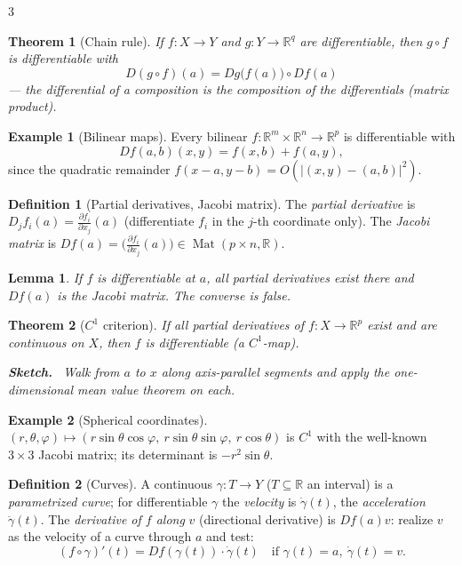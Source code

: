 \documentclass[10pt,a4paper,landscape]{article}
\theoremstyle{definition}
\newtheorem{defn}{Definition}[section]
\newtheorem{exm}{Example}[section]
\theoremstyle{plain}
\newtheorem{thm}{Theorem}[section]
\newtheorem{lem}{Lemma}[section]
\theoremstyle{remark}
\newcommand{\R}{\mathbb{R}}
\newcommand{\abs}[1]{\lvert #1 \rvert}
\newcommand{\comp}{\circ}
\DeclareMathOperator{\Mat}{Mat}
\newenvironment{proofsketch}{%
  \par\small\color{exgray}\textbf{Sketch.}\ }%
  {\par}
\begin{document}
\begin{multicols*}{3}
\begin{thm}[Chain rule]
If $f: X \to Y$ and $g: Y \to \R^q$ are differentiable, then $g \comp f$ is differentiable with
\[
D(g \comp f)(a) = Dg\bigl(f(a)\bigr) \comp Df(a)
\]
--- the differential of a composition is the composition of the differentials (matrix product).
\end{thm}

\begin{exm}[Bilinear maps]
Every bilinear $f: \R^m \times \R^n \to \R^p$ is differentiable with
\[
Df(a,b)(x,y) = f(x, b) + f(a, y),
\]
since the quadratic remainder $f(x - a, y - b) = O(\abs{(x,y)-(a,b)}^2)$.
\end{exm}

\begin{defn}[Partial derivatives, Jacobi matrix]
The \emph{partial derivative} is $D_j f_i(a) = \frac{\partial f_i}{\partial x_j}(a)$ (differentiate $f_i$ in the $j$-th coordinate only). The \emph{Jacobi matrix} is $Df(a) = \bigl(\frac{\partial f_i}{\partial x_j}(a)\bigr) \in \Mat(p \times n, \R)$.
\end{defn}

\begin{lem}
If $f$ is differentiable at $a$, all partial derivatives exist there and $Df(a)$ is the Jacobi matrix. The converse is false.
\end{lem}

\begin{thm}[$C^1$ criterion]
If all partial derivatives of $f: X \to \R^p$ exist and are continuous on $X$, then $f$ is differentiable (a $C^1$-map).
\begin{proofsketch}
Walk from $a$ to $x$ along axis-parallel segments and apply the one-dimensional mean value theorem on each.
\end{proofsketch}
\end{thm}

\begin{exm}[Spherical coordinates]
$(r,\theta,\varphi) \mapsto (r\sin\theta\cos\varphi,\ r\sin\theta\sin\varphi,\ r\cos\theta)$ is $C^1$ with the well-known $3 \times 3$ Jacobi matrix; its determinant is $-r^2 \sin\theta$.
\end{exm}

\begin{defn}[Curves]
A continuous $\gamma: T \to Y$ ($T \subseteq \R$ an interval) is a \emph{parametrized curve}; for differentiable $\gamma$ the \emph{velocity} is $\dot\gamma(t)$, the \emph{acceleration} $\ddot\gamma(t)$. The \emph{derivative of $f$ along} $v$ (directional derivative) is $Df(a)v$: realize $v$ as the velocity of a curve through $a$ and test:
\[
(f \comp \gamma)'(t) = Df(\gamma(t)) \cdot \dot\gamma(t) \quad \text{if } \gamma(t) = a, \ \dot\gamma(t) = v .
\]
\end{defn}


\end{multicols*}
\end{document}
